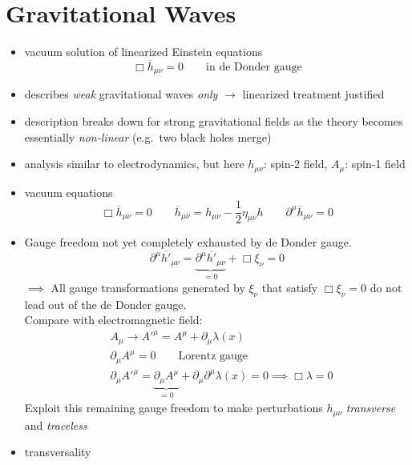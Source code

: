 \chapter{Gravitational Waves}
\begin{itemize}
    \item vacuum solution of linearized Einstein equations
    \begin{equation}
        \Box \overline{h}_{\mu\nu} = 0 \qquad \text{in de Donder gauge}
    \end{equation}
    \item describes \emph{weak} gravitational waves \emph{only} $\rightarrow$ linearized treatment justified
    \item description breaks down for strong gravitational fields as the theory becomes essentially \emph{non-linear} (e.g.\ two black holes merge)
    \item analysis similar to electrodynamics, but here $h_{\mu\nu}$: spin-2 field, $A_\mu$: spin-1 field
    \item vacuum equations
    \begin{equation}
        \Box \overline{h}_{\mu\nu} = 0 \qquad \overline{h}_{\mu\nu}=h_{\mu\nu} - \frac{1}{2} \eta_{\mu\nu} h \qquad \partial^\mu \overline{h}_{\mu\nu} = 0
    \end{equation}
    \item Gauge freedom not yet completely exhausted by de Donder gauge.
    \begin{equation}
        \partial^\mu \overline{h'}_{\mu\nu} = \underbrace{\partial^\mu \overline{h'}_{\mu\nu}}_{=0} + \Box \xi_\nu = 0
    \end{equation}
    $\implies$ All gauge transformations generated by $\xi_\nu$ that satisfy $\Box \xi_\nu = 0$ do not lead out of the de Donder gauge. \\
    Compare with electromagnetic field:
    \begin{align}
        & A_\mu \to {A'}^\mu = A^\mu + \partial_\mu \lambda(x) \\
        & \partial_\mu A^\mu = 0 \qquad \text{Lorentz gauge} \\
        & \partial_\mu {A'}^\mu = \underbrace{ \partial_\mu A^\mu}_{=0} + \partial_\mu \partial^\mu \lambda(x) = 0 \implies \Box \lambda = 0
    \end{align}
    Exploit this remaining gauge freedom to make perturbations $h_{\mu\nu}$ \emph{transverse} and \emph{traceless}
    \item transversality
    \begin{equation}

\end{equation}
\end{itemize}
